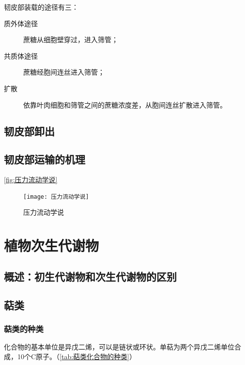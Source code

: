 韧皮部装载的途径有三：
\begin{description}
	\item[质外体途径] 蔗糖从细胞壁穿过，进入筛管；
	\item[共质体途径] 蔗糖经胞间连丝进入筛管；
	\item[扩散] 依靠叶肉细胞和筛管之间的蔗糖浓度差，从胞间连丝扩散进入筛管。
\end{description}

\subsection{韧皮部卸出}

\subsection{韧皮部运输的机理}

\autoref{fig:压力流动学说}
\begin{figure}[htbp]
	\centering
	\texttt{[image: 压力流动学说]}
	\caption{压力流动学说}
	\label{fig:压力流动学说}
\end{figure}

\section{植物次生代谢物}

\subsection{概述：初生代谢物和次生代谢物的区别}

\subsection{萜类}

\subsubsection{萜类的种类}

化合物的基本单位是异戊二烯，可以是链状或环状。单萜为两个异戊二烯单位合成，10个C原子。（\autoref{tab:萜类化合物的种类}）

